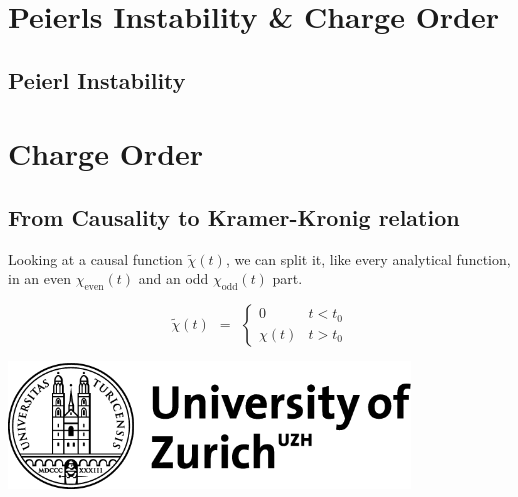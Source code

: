 \documentclass[10pt]{report}
\numberwithin{equation}{chapter}
\begin{document}
%


\chapter{Peierls Instability \& Charge Order}

\section{Peierl Instability}


%

\chapter{Charge Order}

\section{From Causality to Kramer-Kronig relation}


Looking at a causal function $\tilde{\chi}(t)$, we can split it, like every analytical function, in an even $\chi_\text{even}(t)$ and an odd $\chi_\text{odd}(t)$ part.


\begin{minipage}{0.45\textwidth}
  \begin{equation*}
    \tilde{\chi}(t) ~~ = ~~ \left\{ \begin{array}{lc} 
      0        &  t < t_0 \\
      \chi(t)  &  t > t_0
    \end{array}\right.
  \end{equation*}
\end{minipage}
\begin{minipage}{0.1\textwidth}
\end{minipage}
\begin{minipage}{0.45\textwidth}
   \includegraphics[width=0.8\textwidth]{../img/uzh_logo}
\end{minipage}
\end{document}
